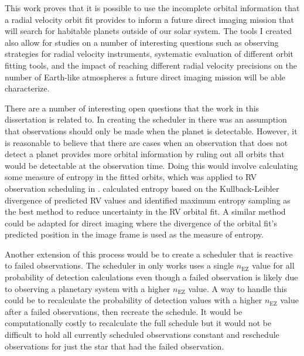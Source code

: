 This work proves that it is possible to use the incomplete orbital information
that a radial velocity orbit fit provides to inform a future direct imaging
mission that will search for habitable planets outside of our solar system. The
tools I created also allow for studies on a number of interesting questions
such as observing strategies for radial velocity instruments, systematic
evaluation of different orbit fitting tools, and the impact of reaching
different radial velocity precisions on the number of Earth-like atmospheres a
future direct imaging mission will be able characterize.

There are a number of interesting open questions that the work in this
dissertation is related to. In creating the scheduler in
 there was an assumption that observations should
only be made when the planet is detectable. However, it is reasonable to
believe that there are cases when an observation that does not detect a planet
provides more orbital information by ruling out all orbits that would be
detectable at the observation time. Doing this would involve calculating some
measure of entropy in the fitted orbits, which was applied to RV observation
scheduling in \citet{loredoBayesianMethodsAnalysis2012}.
\citet{loredoBayesianMethodsAnalysis2012} calculated entropy based on the
Kullback-Leibler divergence of predicted RV values and identified maximum
entropy sampling as the best method to reduce uncertainty in the RV orbital
fit. A similar method could be adapted for direct imaging where the divergence
of the orbital fit's predicted position in the image frame is used as the
measure of entropy.

Another extension of this process would be to create a scheduler that is
reactive to failed observations. The scheduler in 
only works uses a single $n_\textrm{EZ}$ value for all probability of detection
calculations even though a failed observation is likely due to observing a
planetary system with a higher $n_\textrm{EZ}$ value. A way to handle this
could be to recalculate the probability of detection values with a higher
$n_\textrm{EZ}$ value after a failed observations, then recreate the schedule.
It would be computationally costly to recalculate the full schedule but it
would not be difficult to hold all currently scheduled observations constant
and reschedule observations for just the star that had the failed observation.

